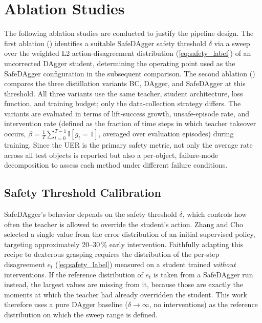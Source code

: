 \section{Ablation Studies}%
\label{sec:ablations}%

The following ablation studies are conducted to justify the pipeline design.
The first ablation () identifies a suitable SafeDAgger safety threshold $\delta$ via a sweep over the weighted L2 action-disagreement distribution (\cref{eq:safety_label}) of an uncorrected DAgger student, determining the operating point used as the SafeDAgger configuration in the subsequent comparison.
The second ablation () compares the three distillation variants \ac{BC}, DAgger, and SafeDAgger at this threshold.
All three variants use the same teacher, student architecture, loss function, and training budget; only the data-collection strategy differs.
The variants are evaluated in terms of lift-success growth, unsafe-episode rate, and intervention rate (defined as the fraction of time steps in which teacher takeover occurs, $\beta = \frac{1}{T}\sum_{t=0}^{T-1}\mathbb{I}[g_t = 1]$, averaged over evaluation episodes) during training.
Since the \ac{UER} is the primary safety metric, not only the average rate across all test objects is reported but also a per-object, failure-mode decomposition to assess each method under different failure conditions.

\subsection{Safety Threshold Calibration}%
\label{sec:ablation_threshold}%

SafeDAgger's behavior depends on the safety threshold $\delta$, which controls how often the teacher is allowed to override the student's action.
Zhang and Cho~\cite{Zhang2016} selected a single value from the error distribution of an initial supervised policy, targeting approximately 20--30\,\% early intervention.
Faithfully adapting this recipe to dexterous grasping requires the distribution of the per-step disagreement $e_t$ (\cref{eq:safety_label}) measured on a student trained \emph{without} interventions.
If the reference distribution of $e_t$ is taken from a SafeDAgger run instead, the largest values are missing from it, because those are exactly the moments at which the teacher had already overridden the student.
This work therefore uses a pure DAgger baseline ($\delta \to \infty$, no interventions) as the reference distribution on which the sweep range is defined.

